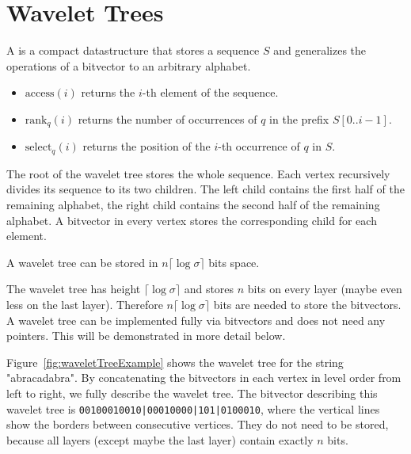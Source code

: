\section{Wavelet Trees}

\begin{Definition}
  A  is a compact datastructure that stores a sequence $S$ and generalizes the operations of a bitvector to an arbitrary alphabet.
  \begin{itemize}
    \item $\mathrm{access}(i)$ returns the $i$-th element of the sequence.
    \item $\mathrm{rank}_q(i)$ returns the number of occurrences of $q$ in the prefix $S[0..i-1]$.
    \item $\mathrm{select}_q(i)$ returns the position of the $i$-th occurrence of $q$ in $S$.
  \end{itemize}

  The root of the wavelet tree stores the whole sequence. Each vertex recursively divides its sequence to its two children. The left child contains the first half of the remaining alphabet, the right child contains the second half of the remaining alphabet. A bitvector in every vertex stores the corresponding child for each element.
\end{Definition}

\begin{Lemma}
  A wavelet tree can be stored in $n\lceil\log\sigma\rceil$ bits space.
\end{Lemma}

\begin{Proof}
  The wavelet tree has height $\lceil\log\sigma\rceil$ and stores $n$ bits on every layer (maybe even less on the last layer). Therefore $n\lceil\log\sigma\rceil$ bits are needed to store the bitvectors. A wavelet tree can be implemented fully via bitvectors and does not need any pointers. This will be demonstrated in more detail below.
\end{Proof}

\begin{Example}
  \label{exp:waveletTree}
  Figure~\ref{fig:waveletTreeExample} shows the wavelet tree for the string "abracadabra". By concatenating the bitvectors in each vertex in level order from left to right, we fully describe the wavelet tree. The bitvector describing this wavelet tree is \texttt{00100010010|00010000|101|0100010}, where the vertical lines show the borders between consecutive vertices. They do not need to be stored, because all layers (except maybe the last layer) contain exactly $n$ bits.
\end{Example}

